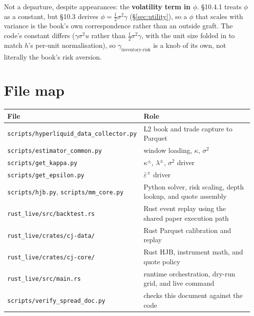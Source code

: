 \documentclass[11pt,a4paper]{article}
\newcommand{\epsb}{\bar{\varepsilon}}
\begin{document}
Not a departure, despite appearances: the \textbf{volatility term in $\phi$}.
\S10.4.1 treats $\phi$ as a constant, but \S10.3 derives
$\phi = \tfrac12\sigma^{2}\gamma$ (\S\ref{sec:utility}), so a $\phi$ that scales
with variance is the book's own correspondence rather than an outside graft. The
code's constant differs ($\gamma\sigma^{2}u$ rather than $\tfrac12\sigma^{2}
\gamma$, with the unit size folded in to match $h$'s per-unit normalisation), so
$\gamma_{\text{inventory-risk}}$ is a knob of its own, not literally the book's
risk aversion.

\appendix
\section{File map}

\begin{center}\small
\begin{tabular}{@{}>{\raggedright\arraybackslash}p{6.2cm}>{\raggedright\arraybackslash}p{8.0cm}@{}}
\toprule
\textbf{File} & \textbf{Role} \\
\midrule
\nolinkurl{scripts/hyperliquid_data_collector.py} & L2 book and trade capture to Parquet \\
\nolinkurl{scripts/estimator_common.py} & window loading, $\kappa$, $\sigma^2$ \\
\nolinkurl{scripts/get_kappa.py} & $\kappa^{\pm}$, $\lambda^{\pm}$, $\sigma^2$ driver \\
\nolinkurl{scripts/get_epsilon.py} & $\epsb^{\pm}$ driver \\
\nolinkurl{scripts/hjb.py}, \nolinkurl{scripts/mm_core.py} & Python solver, risk scaling, depth lookup, and quote assembly \\
\nolinkurl{rust_live/src/backtest.rs} & Rust event replay using the shared paper execution path \\
\nolinkurl{rust_live/crates/cj-data/} & Rust Parquet calibration and replay \\
\nolinkurl{rust_live/crates/cj-core/} & Rust HJB, instrument math, and quote policy \\
\nolinkurl{rust_live/src/main.rs} & runtime orchestration, dry-run grid, and live command \\
\nolinkurl{scripts/verify_spread_doc.py} & checks this document against the code \\
\bottomrule
\end{tabular}
\end{center}
\end{document}
